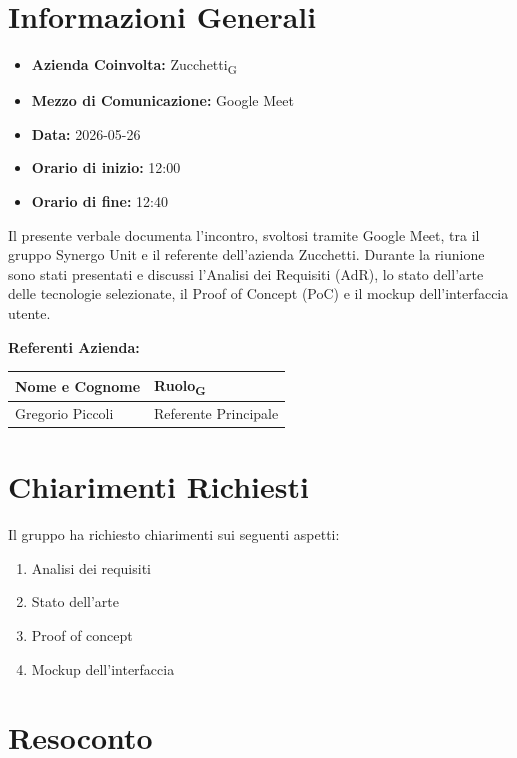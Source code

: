 \section{Informazioni Generali}
\begin{itemize}
	\item \textbf{Azienda Coinvolta:} Zucchetti\textsubscript{G}
	\item \textbf{Mezzo di Comunicazione:} Google Meet
	\item \textbf{Data:} 2026-05-26
	\item \textbf{Orario di inizio:} 12:00
	\item \textbf{Orario di fine:} 12:40
\end{itemize}

Il presente verbale documenta l’incontro, svoltosi tramite Google Meet, 
tra il gruppo Synergo Unit e il referente dell’azienda Zucchetti. 
Durante la riunione sono stati presentati e discussi l’Analisi dei Requisiti (AdR),
lo stato dell’arte delle tecnologie selezionate, il Proof of Concept (PoC) e il mockup dell’interfaccia utente.


\vspace{0.5cm}
\textbf{Referenti Azienda:}
\begin{table}[ht]
	\centering
	\renewcommand{\arraystretch}{1.2}
	\begin{tabularx}{\textwidth}{X l}
		\toprule
		\textbf{Nome e Cognome} & \textbf{Ruolo\textsubscript{G}} \\
		\midrule
		Gregorio Piccoli & Referente Principale \\
		\bottomrule
	\end{tabularx}
\end{table}

\section{Chiarimenti Richiesti}
Il gruppo ha richiesto chiarimenti sui seguenti aspetti:

\begin{enumerate}
	\item Analisi dei requisiti
	\item Stato dell'arte
	\item Proof of concept
	\item Mockup dell’interfaccia
\end{enumerate}

\section{Resoconto}


